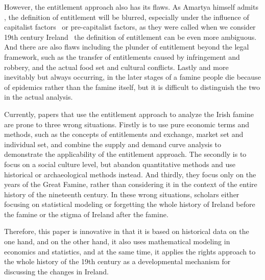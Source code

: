 However, the entitlement approach also has its flaws. As Amartya himself admits \citep{sen1982poverty}, the definition of entitlement will be blurred, especially under the influence of capitalist factors \textendash\ or pre-capitalist factors, as they were called when we consider 19th century Ireland \textendash\ the definition of entitlement can be even more ambiguous. And there are also flaws including the plunder of entitlement beyond the legal framework, such as the transfer of entitlements caused by infringement and robbery, and the actual food set and cultural conflicts. Lastly and more inevitably but always occurring, in the later stages of a famine people die because of epidemics rather than the famine itself, but it is difficult to distinguish the two in the actual analysis.

Currently, papers that use the entitlement approach to analyze the Irish famine are prone to three wrong situations. Firstly is to use pure economic terms and methods, such as the concepts of entitlements and exchange, market set and individual set, and combine the supply and demand curve analysis to demonstrate the applicability of the entitlement approach. The secondly is to focus on a social culture level, but abandon quantitative methods and use historical or archaeological methods instead. And thirdly, they focus only on the years of the Great Famine, rather than considering it in the context of the entire history of the nineteenth century. In these wrong situations, scholars either focusing on statistical modeling or forgetting the whole history of Ireland before the famine or the stigma of Ireland after the famine. 

Therefore, this paper is innovative in that it is based on historical data on the one hand, and on the other hand, it also uses mathematical modeling in economics and statistics, and at the same time, it applies the rights approach to the whole history of the 19th century as a developmental mechanism for discussing the changes in Ireland.


